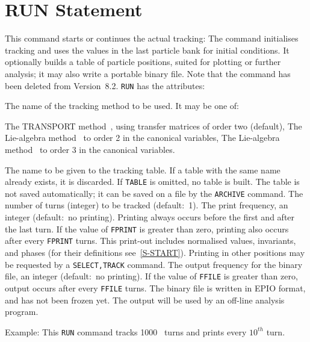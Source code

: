 \section{RUN Statement}
\label{S-RUN}
This command starts or continues the actual tracking:
The  command initialises tracking and uses the values in the last
particle bank for initial conditions.
It optionally builds a table of particle positions, suited for plotting
or further analysis;
it may also write a portable binary file.
Note that the  command has been deleted from
Version~8.2.
{\tt RUN} has the attributes:
\begin{mylist}
The name of the tracking method to be used.
It may be one of:
\begin{mylist}
The TRANSPORT method~\cite{B-BRO80},
using transfer matrices of order two (default),
The Lie-algebra method~\cite{B-DRA81}
to order 2 in the canonical variables,
The Lie-algebra method~\cite{B-DRA81}
to order 3 in the canonical variables.
\end{mylist}
The name to be given to the tracking table.
If a table with the same name already exists, it is discarded.
If {\tt TABLE} is omitted, no table is built.
The table is not saved automatically;
it can be saved on a file by the {\tt ARCHIVE} command.
The number of turns (integer) to be tracked (default:~1).
The print frequency, an integer (default:~no printing).
Printing always occurs before the first and after the last turn.
If the value of {\tt FPRINT} is greater than zero,
printing also occurs after every {\tt FPRINT} turns.
This print-out includes normalised values, invariants, and phases
(for their definitions see~\ref{S-START}).
Printing in other positions may be requested by a {\tt SELECT,TRACK}
command.
The output frequency for the binary file, an integer (default:~no printing).
If the value of {\tt FFILE} is greater than zero,
output occurs after every {\tt FFILE} turns.
The binary file is written in EPIO format, and has not been frozen yet.
The output will be used by an off-line analysis program.
\end{mylist}
Example:
This {\tt RUN} command tracks 1000~ turns and prints every \(10^{th}\) turn.
 
